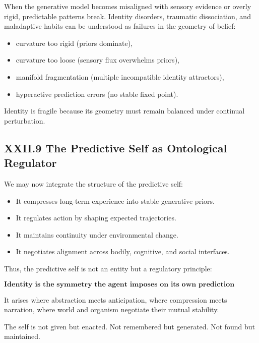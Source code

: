 \documentclass[11pt,letterpaper]{article}
\begin{document}
When the generative model becomes misaligned with sensory evidence or overly rigid, predictable patterns break. Identity disorders, traumatic dissociation, and maladaptive habits can be understood as failures in the geometry of belief:

\begin{itemize}
    \item curvature too rigid (priors dominate),
    \item curvature too loose (sensory flux overwhelms priors),
    \item manifold fragmentation (multiple incompatible identity attractors),
    \item hyperactive prediction errors (no stable fixed point).
\end{itemize}

Identity is fragile because its geometry must remain balanced under continual perturbation.

\subsection{XXII.9 The Predictive Self as Ontological Regulator}

We may now integrate the structure of the predictive self:

\begin{itemize}
    \item It compresses long-term experience into stable generative priors.
    \item It regulates action by shaping expected trajectories.
    \item It maintains continuity under environmental change.
    \item It negotiates alignment across bodily, cognitive, and social interfaces.
\end{itemize}

Thus, the predictive self is not an entity but a regulatory principle:

\[
\textbf{Identity is the symmetry the agent imposes on its own prediction errors.}
\]

It arises where abstraction meets anticipation, where compression meets narration, where world and organism negotiate their mutual stability.

The self is not given but enacted.  
Not remembered but generated.  
Not found but maintained.
\end{document}
